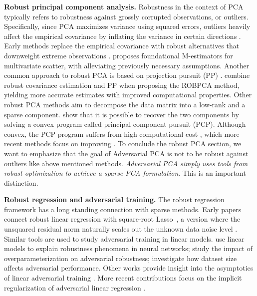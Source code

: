 \documentclass{article}
\begin{document}
\textbf{Robust principal component analysis.} Robustness in the context of PCA typically refers to robustness against grossly corrupted observations, or outliers. Specifically, since PCA maximizes variance using squared errors, outliers heavily affect the empirical covariance by inflating the variance in certain directions \cite[ch.~10]{jolliffe_principal_2002}. Early methods replace the empirical covariance with robust alternatives that downweight extreme observations \cite{lerman_overview_2018}. \cite{maronna_robust_1976} proposes foundational M-estimators for multivariate scatter, with \cite{tyler_distribution-free_1987} alleviating previously necessary assumptions. Another common approach to robust PCA is based on projection pursuit (PP) \cite{friedman_projection_1974, huber_projection_1985}. \cite{hubert_robpca_2005} combine robust covariance estimation and PP when proposing the ROBPCA method, yielding more accurate estimates with improved computational properties. Other robust PCA methods aim to decompose the data matrix into a low-rank and a sparse component. \cite{candes_robust_2011} show that it is possible to recover the two components by solving a convex program called principal component pursuit (PCP). Although convex, the PCP program suffers from high computational cost \cite{bouwmansRobustPCAPrincipal2014}, which more recent methods focus on improving \cite{lin_linearized_2011, yuan_sparse_2009}. To conclude the robust PCA section, we want to emphasize that the goal of Adversarial PCA is not to be robust against outliers like above mentioned methods. \textit{Adversarial PCA simply uses tools from robust optimization to achieve a sparse PCA formulation}. This is an important distinction.

\textbf{Robust regression and adversarial training.} The robust regression framework has a long standing connection with sparse methods. Early papers connect robust linear regression with square-root Lasso~\cite{NIPS2008_24681928}, a version where the unsquared residual norm naturally scales out the unknown data noise level \cite{4561409b-2457-3af7-afb4-8a4e5ac01eec}. Similar tools are used to study adversarial training in linear models. \cite{ilyas_adversarial_2019, tsipras_robustness_2019} use linear models to explain robustness phenomena in neural networks; \cite{ribeiro_overparameterized_2023} study the impact of overparameterization on adversarial robustness; \cite{pmlr-v161-min21a} investigate how dataset size affects adversarial performance. Other works provide insight into the asymptotics of linear adversarial training \cite{javanmard_precise_2020, taheri_asymptotic_2022}. More recent contributions focus on the implicit regularization of adversarial linear regression \cite{ribeiro_regularization_2023, ribeiro_kernel_2025, xie_highdimensional_2024}.
\end{document}
